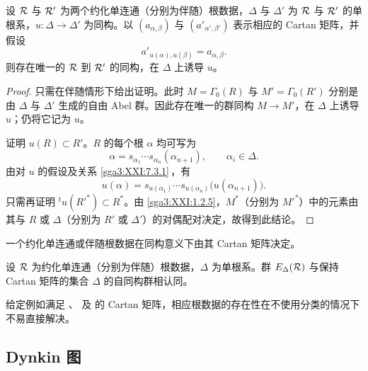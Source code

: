 \begin{proposition}\label{sga3:XXI:7.3.2}
设 \(\mathcal{R}\) 与 \(\mathcal{R}'\) 为两个约化单连通（分别为伴随）根数据，\(\Delta\) 与 \(\Delta'\) 为 \(\mathcal{R}\) 与 \(\mathcal{R}'\) 的单根系，\(u:\Delta\to\Delta'\) 为同构。以 \((a_{\alpha,\beta})\) 与 \((a'_{\alpha',\beta'})\) 表示相应的 Cartan 矩阵，并假设
\[
 a'_{u(\alpha),u(\beta)}=a_{\alpha,\beta}.
\]
则存在唯一的 \(\mathcal{R}\) 到 \(\mathcal{R}'\) 的同构，在 \(\Delta\) 上诱导 \(u\)。
\end{proposition}

\begin{proof}
只需在伴随情形下给出证明。此时 \(M=\Gamma_0(R)\) 与 \(M'=\Gamma_0(R')\) 分别是由 \(\Delta\) 与 \(\Delta'\) 生成的自由 Abel 群。因此存在唯一的群同构 \(M\to M'\)，在 \(\Delta\) 上诱导 \(u\)；仍将它记为 \(u\)。

证明 \(u(R)\subset R'\)。\(R\) 的每个根 \(\alpha\) 均可写为
\[
 \alpha=s_{\alpha_1}\cdots s_{\alpha_n}(\alpha_{n+1}),
 \qquad \alpha_i\in\Delta.
\]
由对 \(u\) 的假设及关系 \ref{sga3:XXI:7.3.1}\,，有
\[
 u(\alpha)=
 s_{u(\alpha_1)}\cdots s_{u(\alpha_n)}
 \bigl(u(\alpha_{n+1})\bigr).
\]
只需再证明 \({}^tu(R'^\ast)\subset R^\ast\)。由 \ref{sga3:XXI:1.2.5}，\(M^\ast\)（分别为 \(M'^\ast\)）中的元素由其与 \(R\) 或 \(\Delta\)（分别为 \(R'\) 或 \(\Delta'\)）的对偶配对决定，故得到此结论。
\end{proof}

\begin{corollary}\label{sga3:XXI:7.3.3}
一个约化单连通或伴随根数据在同构意义下由其 Cartan 矩阵决定。
\end{corollary}

\begin{corollary}\label{sga3:XXI:7.3.4}
设 \(\mathcal{R}\) 为约化单连通（分别为伴随）根数据，\(\Delta\) 为单根系。群 \(E_\Delta(\mathcal{R})\) 与保持 Cartan 矩阵的集合 \(\Delta\) 的自同构群相认同。
\end{corollary}

\begin{remark}\label{sga3:XXI:7.3.5}
给定例如满足 、 及  的 Cartan 矩阵，相应根数据的存在性在不使用分类的情况下不易直接解决。
\end{remark}

\subsection{Dynkin 图}\label{sga3:XXI:7.4}

